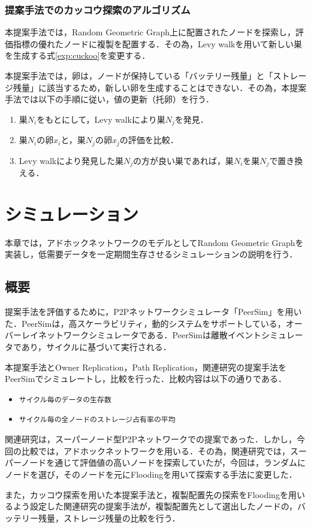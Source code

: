 \documentclass[11pt]{jreport}
\begin{document}
\subsection{提案手法でのカッコウ探索のアルゴリズム}
本提案手法では，Random Geometric Graph上に配置されたノードを探索し，評価指標の優れたノードに複製を配置する．その為，Levy walkを用いて新しい巣を生成する式\ref{exp:cuckoo}を変更する．
\par 本提案手法では，卵は，ノードが保持している「バッテリー残量」と「ストレージ残量」に該当するため，新しい卵を生成することはできない．その為，本提案手法では以下の手順に従い，値の更新（托卵）を行う．

\begin{enumerate}
	\item 巣$N_i$をもとにして，Levy walkにより巣$N_j$を発見．
	\item 巣$N_i$の卵$x_i$と，巣$N_j$の卵$x_j$の評価を比較．
	\item Levy walkにより発見した巣$N_j$の方が良い巣であれば，巣$N_i$を巣$N_j$で置き換える．
\end{enumerate}



\chapter{シミュレーション}
本章では，アドホックネットワークのモデルとしてRandom Geometric Graphを実装し，低需要データを一定期間生存させるシミュレーションの説明を行う．

\section{概要}
提案手法を評価するために，P2Pネットワークシミュレータ「PeerSim\cite{peersim}」を用いた．PeerSimは，高スケーラビリティ，動的システムをサポートしている，オーバーレイネットワークシミュレータである．PeerSimは離散イベントシミュレータであり，サイクルに基づいて実行される．
\par 本提案手法とOwner Replication，Path Replication，関連研究の提案手法をPeerSimでシミュレートし，比較を行った．比較内容は以下の通りである．

\begin{itemize}
	\item {\tt サイクル毎のデータの生存数}
	\item {\tt サイクル毎の全ノードのストレージ占有率の平均}
\end{itemize}

\par 関連研究は，スーパーノード型P2Pネットワークでの提案であった．しかし，今回の比較では，アドホックネットワークを用いる．その為，関連研究では，スーパーノードを通じて評価値の高いノードを探索していたが，今回は，ランダムにノードを選び，そのノードを元にFloodingを用いて探索する手法に変更した．
\par また，カッコウ探索を用いた本提案手法と，複製配置先の探索をFloodingを用いるよう設定した関連研究の提案手法が，複製配置先として選出したノードの，バッテリー残量，ストレージ残量の比較を行う．
\end{document}
